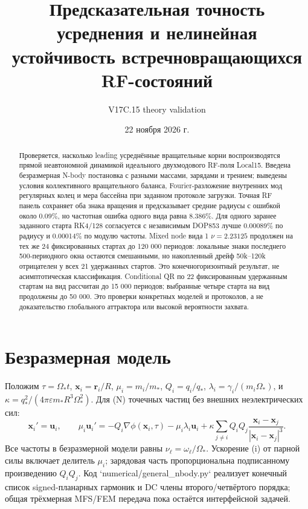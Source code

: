 \documentclass[11pt,a4paper]{article}
\title{Предсказательная точность усреднения и нелинейная устойчивость встречновращающихся RF-состояний}
\author{V17C.15 theory validation}
\date{22 ноября 2026 г.}
\begin{document}
\maketitle

\begin{abstract}
Проверяется, насколько leading усреднённые вращательные корни воспроизводятся прямой неавтономной динамикой идеального двухмодового RF-поля Local15. Введена безразмерная N-body постановка с разными массами, зарядами и трением; выведены условия коллективного вращательного баланса, Fourier-разложение внутренних мод регулярных колец и мера бассейна при заданном протоколе загрузки. Точная RF панель сохраняет оба знака вращения и предсказывает средние радиусы с ошибкой около 0.09\%, но частотная ошибка одного вида равна 8.386\%. Для одного заранее заданного старта RK4/128 согласуется с независимым DOP853 лучше 0.00089\% по радиусу и 0.00014\% по модулю частоты. Mixed node вида 1 \(\nu=2.23125\) продолжен на тех же 24 фиксированных стартах до 120 000 периодов: локальные знаки последнего 500-периодного окна остаются смешанными, но накопленный дрейф 50k--120k отрицателен у всех 21 удержанных стартов. Это конечногоризонтный результат, не асимптотическая классификация. Conditional QR по 22 фиксированным удержанным стартам на вид рассчитан до 15 000 периодов; выбранные четыре старта на вид продолжены до 50 000. Это проверки конкретных моделей и протоколов, а не доказательство глобального аттрактора или высокой вероятности захвата.
\end{abstract}

\section{Безразмерная модель}
Положим \(\tau=\Omega_*t\), \(\mathbf x_i=\mathbf r_i/R\), \(\mu_i=m_i/m_*\), \(Q_i=q_i/q_*\), \(\lambda_i=\gamma_i/(m_i\Omega_*)\), и \(\kappa=q_*^2/(4\pi\varepsilon m_*R^3\Omega_*^2)\). Для (N) точечных частиц без внешних неэлектрических сил:
\begin{equation}
\mathbf x_i'=\mathbf u_i,\qquad
\mu_i\mathbf u_i'=-Q_i\nabla\phi(\mathbf x_i,\tau)-\mu_i\lambda_i\mathbf u_i
+\kappa\sum_{j\ne i}Q_iQ_j\frac{\mathbf x_i-\mathbf x_j}{|\mathbf x_i-\mathbf x_j|^3}.
\label{eq:nbody}
\end{equation}
Все частоты в безразмерной модели равны \(\nu_\ell=\omega_\ell/\Omega_*\). Ускорение (i) от парной силы включает делитель \(\mu_i\); зарядовая часть пропорциональна подписанному произведению \(Q_iQ_j\). Код `numerical/general_nbody.py` реализует конечный список signed-планарных гармоник и DC члены второго/четвёртого порядка; общая трёхмерная MFS/FEM передача пока остаётся интерфейсной задачей.
\end{document}
